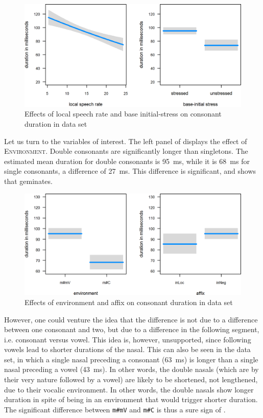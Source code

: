 \begin{figure}
	\includegraphics  [scale=0.8] {images/Corpus/inModelcov.png}
	\caption{Effects of local speech rate and base initial-stress on consonant duration in data set}
	\label{fig:covariates in}
\end{figure}

Let us turn to the variables of interest. The left panel of  displays the effect of \textsc{Environment}. Double consonants are significantly longer than singletons. The estimated mean duration for double consonants is 95~ms, while it is 68~ms for single consonants, a difference of 27~ms. This difference is significant, and shows that  geminates. 

\begin{figure}
	\includegraphics [scale=0.8]  {images/Corpus/inModel.png}
	\caption{Effects of environment and affix on consonant duration in data set}
	\label{fig:inModel}
\end{figure}



However, one could venture the idea that the difference is not due to a difference between one consonant and two, but due to a difference in the following segment, i.e. consonant versus vowel. This idea is, however, unsupported, since following vowels lead to shorter durations of the nasal. This can also be seen in the data set, in which a single nasal preceding a consonant (63~ms) is longer than a single nasal preceding a vowel (43~ms). In other words, the double nasals (which are by their very nature followed by a vowel) are likely to be shortened, not lengthened, due to their vocalic environment. In other words, the double nasals show longer duration in spite of being in an environment that would trigger shorter duration. The significant difference between \texttt{m\#mV}  and \texttt{m\#C} is thus a sure sign of .



